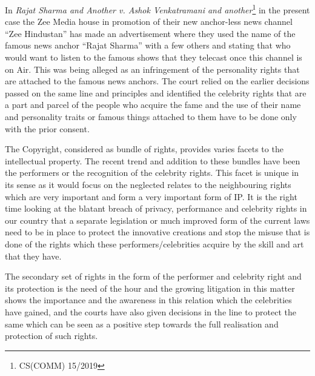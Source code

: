 \begin{multicols}{2}
\noi
In \textit{Rajat Sharma and Another v. Ashok Venkatramani and another}\footnote{CS(COMM) 15/2019} in the present case the
Zee Media house in promotion of their new anchor-less news channel “Zee Hindustan” has
made an advertisement where they used the name of the famous news anchor “Rajat Sharma”
with a few others and stating that who would want to listen to the famous shows that they
telecast once this channel is on Air. This was being alleged as an infringement of the
personality rights that are attached to the famous news anchors. The court relied on the earlier
decisions passed on the same line and principles and identified the celebrity rights that are a
part and parcel of the people who acquire the fame and the use of their name and personality
traits or famous things attached to them have to be done only with the prior consent. 


\noi
The Copyright, considered as bundle of rights, provides varies facets to the intellectual
property. The recent trend and addition to these bundles have been the performers or the
recognition of the celebrity rights. This facet is unique in its sense as it would focus on the
neglected relates to the neighbouring rights which are very important and form a very
important form of IP. It is the right time looking at the blatant breach of privacy, performance
and celebrity rights in our country that a separate legislation or much improved form of the
current laws need to be in place to protect the innovative creations and stop the misuse that is
done of the rights which these performers/celebrities acquire by the skill and art that they
have.

\noi
The secondary set of rights in the form of the performer and celebrity right and its protection
is the need of the hour and the growing litigation in this matter shows the importance and the awareness in this relation which the celebrities have gained, and the courts have also given
decisions in the line to protect the same which can be seen as a positive step towards the full
realisation and protection of such rights.

\end{multicols}
